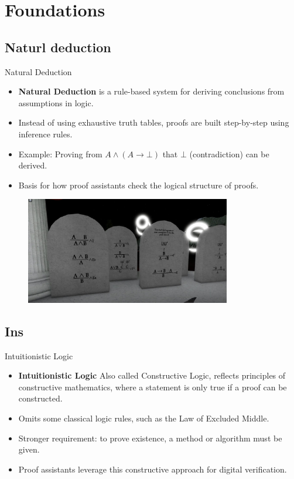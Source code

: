 \documentclass[aspectratio=169, 12pt]{beamer}
\begin{document}
\section{Foundations}

\subsection*{Naturl deduction}
\begin{frame}{Natural Deduction}
\begin{itemize}
    \item \textbf{Natural Deduction} is a rule-based system for deriving conclusions from assumptions in logic.
    \item Instead of using exhaustive truth tables, proofs are built step-by-step using inference rules.
    \item Example: Proving from $A \land (A \rightarrow \bot)$ that $\bot$ (contradiction) can be derived.
    \item Basis for how proof assistants check the logical structure of proofs.
\end{itemize}
\end{frame}
\begin{frame}
    \begin{figure}[h]
  \centering
  \includegraphics[width=0.8\textwidth]{nd.jpeg}
\end{figure}
\end{frame}

\subsection*{Ins}
\begin{frame}{Intuitionistic Logic}
\begin{itemize}
    \item \textbf{Intuitionistic Logic} Also called Constructive Logic, reflects principles of constructive mathematics, where a statement is only true if a proof can be constructed.
    \item Omits some classical logic rules, such as the Law of Excluded Middle.
    \item Stronger requirement: to prove existence, a method or algorithm must be given.
    \item Proof assistants leverage this constructive approach for digital verification.
\end{itemize}
\end{frame}
 
\end{document}
